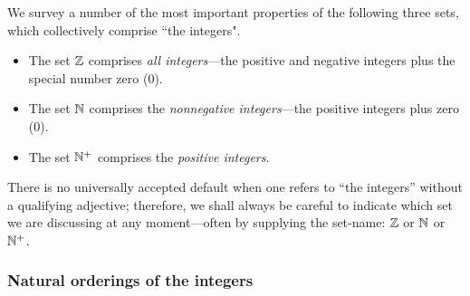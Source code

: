 We survey a number of the most important properties of the following three sets, which collectively comprise ``the integers".
\begin{itemize}
\item
The set $\mathbb{Z}$ comprises {\em all integers}---the positive and negative integers plus the special number zero ($0$).
\medskip\item
The set $\mathbb{N}$ comprises the {\em nonnegative integers}---the positive integers plus zero ($0$).
\medskip\item
The set $\mathbb{N}^+$ comprises the {\em positive integers}.
\end{itemize}
There is no universally accepted default when one refers to ``the integers'' without a qualifying adjective; therefore, we shall always be careful to indicate which set we are discussing at any moment---often by supplying the set-name: $\mathbb{Z}$ or $\mathbb{N}$ or $\mathbb{N}^+$.

\subsubsection{Natural orderings of the integers}
\label{sec:natural-orderings}


